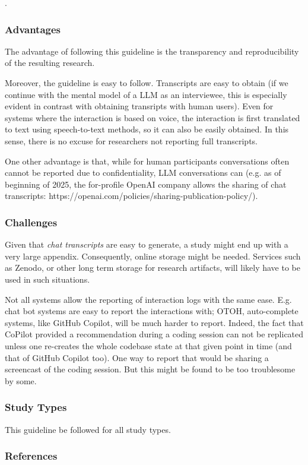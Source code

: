 . 


\subsubsection{Advantages}

The advantage of following this guideline is the transparency and reproducibility of the resulting research. 

Moreover, the guideline is easy to follow. Transcripts are easy to obtain (if we continue with the mental model of a LLM as an interviewee, this is especially evident in contrast with obtaining transripts with human users). Even for systems where the interaction is based on voice, the interaction is first translated to text using speech-to-text methods, so it can also be easily obtained. In this sense, there is no excuse for researchers not reporting full transcripts. 

One other advantage is that, while for human participants conversations often cannot be reported due to confidentiality, LLM conversations can (e.g. as of beginning of 2025, the for-profile OpenAI company allows the sharing of chat transcripts: https://openai.com/policies/sharing-publication-policy/). 


\subsubsection{Challenges}

Given that {\em chat transcripts} are easy to generate, a study might end up with a very large appendix. Consequently, online storage might be needed. Services such as Zenodo, or other long term storage for research artifacts, will likely have to be used in such situations.

Not all systems allow the reporting of interaction logs with the same ease. E.g. chat bot systems are easy to report the interactions with; OTOH, auto-complete systems, like GitHub Copilot, will be much harder to report. Indeed, the fact that CoPilot provided a recommendation during a coding session can not be replicated unless one re-creates the whole codebase state at that given point in time (and that of GitHub Copilot too). One way to report that would be sharing a screencast of the coding session. But this might be found to be too troublesome by some. 


\subsubsection{Study Types}

This guideline \should be followed for all study types. 


\subsubsection{References}





